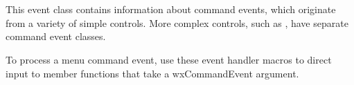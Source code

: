 \section{}\label{wxcommandevent}

This event class contains information about command events, which originate from a variety of
simple controls. More complex controls, such as , have separate command event classes.




To process a menu command event, use these event handler macros to direct input to member
functions that take a wxCommandEvent argument.


